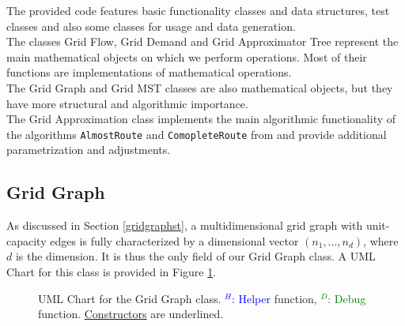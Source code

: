 The provided code features basic functionality classes and data structures, test classes and also some classes for usage and data generation.\\
The classes Grid Flow, Grid Demand and Grid Approximator Tree represent the main mathematical objects on which we perform operations. Most of their functions are implementations of mathematical operations.\\
The Grid Graph and Grid MST classes are also mathematical objects, but they have more structural and algorithmic importance.\\
The Grid Approximation class implements the main algorithmic functionality of the algorithms \texttt{AlmostRoute} and \texttt{ComopleteRoute} from \cite{nmfnlt} and provide additional parametrization and adjustments.

\subsection{Grid Graph}

As discussed in Section \ref{gridgraphst}, a multidimensional grid graph with unit-capacity edges is fully characterized by a dimensional vector $(n_1,...,n_d)$, where $d$ is the dimension. It is thus the only field of our Grid Graph class. A UML Chart for this class is provided in Figure \ref{class_graph}.

\begin{figure}
\caption{UML Chart for the Grid Graph class. \textcolor{blue}{$ ^H$: Helper} function, \textcolor{Green}{$ ^D$: Debug} function. \underline{Constructors} are underlined.}\label{class_graph}
\end{figure}


